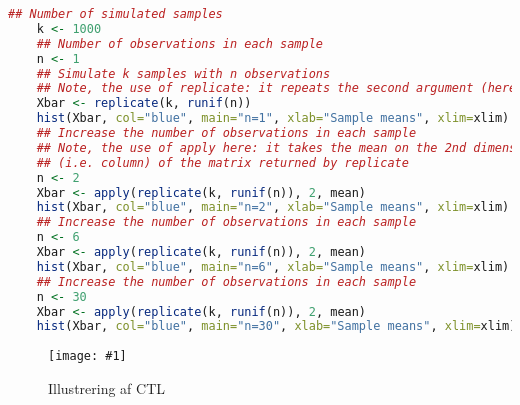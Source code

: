 \documentclass{article}
\newcommand{\pic}[3]{\begin{figure}[H]
		\centering
		\texttt{[image: \#1]}
		
		\caption{#2}
\end{figure}}
\begin{document}
	\begin{lstlisting}[language=R]
	## Number of simulated samples
	k <- 1000
	## Number of observations in each sample
	n <- 1
	## Simulate k samples with n observations
	## Note, the use of replicate: it repeats the second argument (here k times)
	Xbar <- replicate(k, runif(n))
	hist(Xbar, col="blue", main="n=1", xlab="Sample means", xlim=xlim)
	## Increase the number of observations in each sample
	## Note, the use of apply here: it takes the mean on the 2nd dimension
	## (i.e. column) of the matrix returned by replicate
	n <- 2
	Xbar <- apply(replicate(k, runif(n)), 2, mean)
	hist(Xbar, col="blue", main="n=2", xlab="Sample means", xlim=xlim)
	## Increase the number of observations in each sample
	n <- 6
	Xbar <- apply(replicate(k, runif(n)), 2, mean)
	hist(Xbar, col="blue", main="n=6", xlab="Sample means", xlim=xlim)
	## Increase the number of observations in each sample
	n <- 30
	Xbar <- apply(replicate(k, runif(n)), 2, mean)
	hist(Xbar, col="blue", main="n=30", xlab="Sample means", xlim=xlim)\end{lstlisting}
	
	\pic{CTL}{Illustrering af CTL}{\linewidth}
\end{document}
